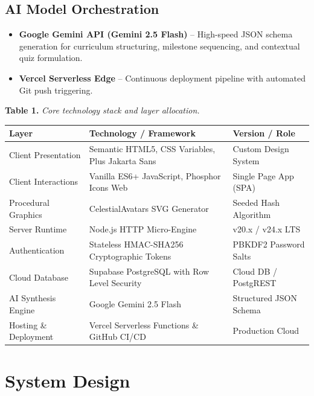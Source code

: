 \documentclass[12pt,a4paper]{article}
\begin{document}
\subsection{AI Model Orchestration}
\begin{itemize}[leftmargin=1.5em, itemsep=4pt]
    \item \textbf{Google Gemini API (Gemini 2.5 Flash)} -- High-speed JSON schema generation for curriculum structuring, milestone sequencing, and contextual quiz formulation.
    \item \textbf{Vercel Serverless Edge} -- Continuous deployment pipeline with automated Git push triggering.
\end{itemize}

\vspace{8pt}
\noindent
\textbf{Table 1.} \textit{Core technology stack and layer allocation.}
\vspace{4pt}

\noindent
{}
\begin{tabularx}{\textwidth}{l X l}
\toprule
\rowcolor{tableHeadNavy}
\textbf{Layer} & \textbf{Technology / Framework} & \textbf{Version / Role} \\
\midrule
Client Presentation & Semantic HTML5, CSS Variables, Plus Jakarta Sans & Custom Design System \\
Client Interactions & Vanilla ES6+ JavaScript, Phosphor Icons Web & Single Page App (SPA) \\
Procedural Graphics & CelestialAvatars SVG Generator & Seeded Hash Algorithm \\
Server Runtime & Node.js HTTP Micro-Engine & v20.x / v24.x LTS \\
Authentication & Stateless HMAC-SHA256 Cryptographic Tokens & PBKDF2 Password Salts \\
Cloud Database & Supabase PostgreSQL with Row Level Security & Cloud DB / PostgREST \\
AI Synthesis Engine & Google Gemini 2.5 Flash & Structured JSON Schema \\
Hosting \& Deployment & Vercel Serverless Functions \& GitHub CI/CD & Production Cloud \\
\bottomrule
\end{tabularx}

\newpage

\section{System Design}
\end{document}

